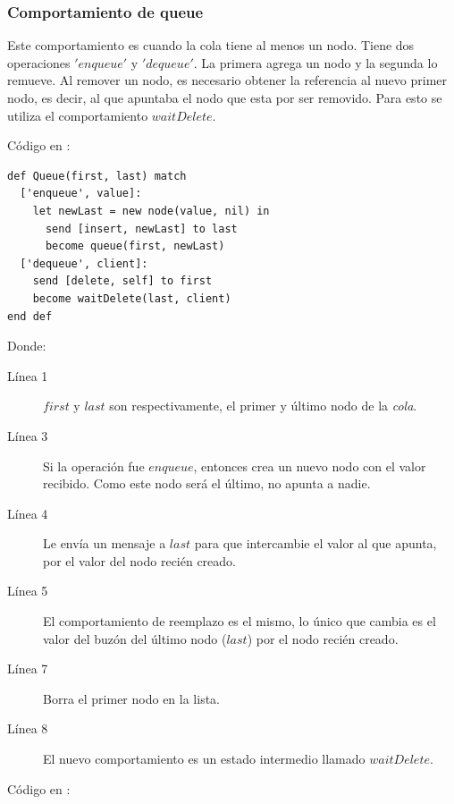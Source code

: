 \subsubsection*{Comportamiento de queue}
Este comportamiento es cuando la cola tiene al menos un nodo. Tiene dos operaciones $'enqueue'$ y $'dequeue'$. La primera agrega un nodo y la segunda lo remueve. Al remover un nodo, es necesario obtener la referencia al nuevo primer nodo, es decir, al que apuntaba el nodo que esta por ser removido. Para esto se utiliza el comportamiento $waitDelete$.

Código en \SAL:

\begin{lstlisting}[language=sal, style=simple]
def Queue(first, last) match 
  ['enqueue', value]: 
    let newLast = new node(value, nil) in
      send [insert, newLast] to last
      become queue(first, newLast)
  ['dequeue', client]: 
    send [delete, self] to first
    become waitDelete(last, client)
end def
\end{lstlisting}

Donde:

\begin{description}
 \item [Línea 1] $first$ y $last$ son respectivamente, el primer y último nodo de la \textit{cola}.
 \item [Línea 3] Si la operación fue $enqueue$, entonces crea un nuevo nodo con el valor recibido. Como este nodo será el último, no apunta a nadie.
 \item [Línea 4] Le envía un mensaje a $last$ para que intercambie el valor al que apunta, por el valor del nodo recién creado.
 \item [Línea 5] El comportamiento de reemplazo es el mismo, lo único que cambia es el valor del buzón del último nodo ($last$) por el nodo recién creado.
 \item [Línea 7] Borra el primer nodo en la lista.
 \item [Línea 8] El nuevo comportamiento es un estado intermedio llamado $waitDelete$.
\end{description}

Código en \CSP:

